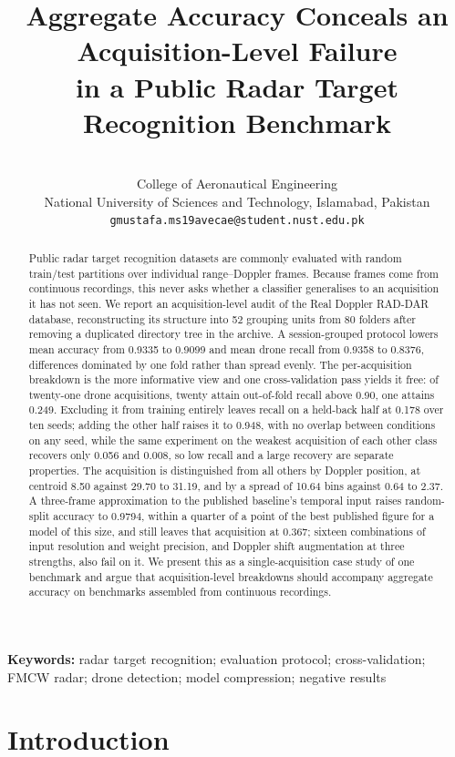\documentclass[11pt,a4paper]{article}
\title{\bfseries Aggregate Accuracy Conceals an Acquisition-Level Failure\\
in a Public Radar Target Recognition Benchmark}
\author{}
\date{}
\author{\authorblock\\[3pt]
  \normalsize College of Aeronautical Engineering\\
  \normalsize National University of Sciences and Technology, Islamabad, Pakistan\\[2pt]
  \small\texttt{gmustafa.ms19avecae@student.nust.edu.pk}}
\date{}
\begin{document}
\maketitle

\begin{abstract}
\noindent
Public radar target recognition datasets are commonly evaluated with random train/test partitions over individual range--Doppler frames. Because frames come from continuous recordings, this never asks whether a classifier generalises to an acquisition it has not seen. We report an acquisition-level audit of the Real Doppler RAD-DAR database, reconstructing its structure into 52 grouping units from 80 folders after removing a duplicated directory tree in the archive. A session-grouped protocol lowers mean accuracy from 0.9335 to 0.9099 and mean drone recall from 0.9358 to 0.8376, differences dominated by one fold rather than spread evenly. The per-acquisition breakdown is the more informative view and one cross-validation pass yields it free: of twenty-one drone acquisitions, twenty attain out-of-fold recall above 0.90, one attains 0.249. Excluding it from training entirely leaves recall on a held-back half at 0.178 over ten seeds; adding the other half raises it to 0.948, with no overlap between conditions on any seed, while the same experiment on the weakest acquisition of each other class recovers only 0.056 and 0.008, so low recall and a large recovery are separate properties. The acquisition is distinguished from all others by Doppler position, at centroid 8.50 against 29.70 to 31.19, and by a spread of 10.64 bins against 0.64 to 2.37. A three-frame approximation to the published baseline's temporal input raises random-split accuracy to 0.9794, within a quarter of a point of the best published figure for a model of this size, and still leaves that acquisition at 0.367; sixteen combinations of input resolution and weight precision, and Doppler shift augmentation at three strengths, also fail on it. We present this as a single-acquisition case study of one benchmark and argue that acquisition-level breakdowns should accompany aggregate accuracy on benchmarks assembled from continuous recordings.
\end{abstract}

\noindent\textbf{Keywords:} radar target recognition; evaluation protocol; cross-validation; FMCW radar; drone detection; model compression; negative results

\section{Introduction}
\label{sec:intro}
\end{document}
